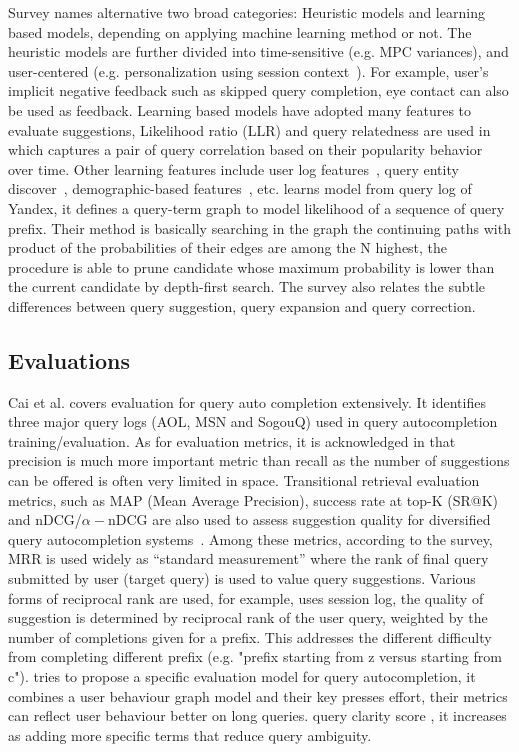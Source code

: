 \documentclass[12pt]{article} %
\begin{document}
Survey \cite{cai_survey_2016} names alternative two broad categories: Heuristic models and learning based models, depending on applying machine learning method or not.
The heuristic models are further divided into time-sensitive (e.g. MPC variances), and user-centered (e.g. personalization using session context~\cite{schmidt_context_sensitive_2016}).
For example, user's implicit negative feedback such as skipped query completion, eye contact can also be used as feedback.
Learning based models have adopted many features to evaluate suggestions, Likelihood ratio (LLR) and query relatedness are used in \cite{chien_semantic_2005} which captures a pair of query correlation based on their popularity behavior over time. Other learning features include user log features~\cite{kharitonov_user_2013}, query entity discover~\cite{guo_named_2009}, demographic-based features~\cite{shokouhi_learning_2013}, etc.
\cite{kharitonov_user_2013} learns model from query log of Yandex,
it defines a query-term graph to model likelihood of a sequence of query prefix. Their
method is basically searching in the graph the continuing paths with product of
the probabilities of their edges are among the N highest, the procedure is able to
prune candidate whose maximum probability is lower than the current candidate
by depth-first search.
The survey also relates the subtle differences between query suggestion, query expansion and query correction.

\subsection{Evaluations}
Cai et al. \cite{cai_survey_2016} covers evaluation for query auto completion extensively.
It identifies three major query logs (AOL, MSN and SogouQ) used in query autocompletion training/evaluation.
As for evaluation metrics, 
it is acknowledged in \cite{bhatia_query_2011} that precision is much more important metric than recall as the number of suggestions can be offered is often very limited in space.
Transitional retrieval evaluation metrics, such as MAP (Mean Average Precision), success rate at top-K (SR@K) and nDCG/$\alpha-$nDCG are also used to assess suggestion quality for diversified query autocompletion systems~\cite{cai_survey_2016}.
Among these metrics, according to the survey, MRR is used widely as ``standard measurement'' where the rank of final query submitted by user (target query) is used to value query suggestions.
Various forms of reciprocal rank are used, for example, \cite{bar-yossef_context-sensitive_2011} uses session log, the quality of suggestion is determined by reciprocal rank
of the user query, weighted by the number of completions given for a prefix. This addresses the different difficulty from completing different prefix (e.g. "prefix starting from z versus starting from c").
\cite{kharitonov_user_2013} tries to propose a specific evaluation model for query autocompletion, it combines a user behaviour graph model and their key presses effort, their metrics can reflect user behaviour better on long queries.
query clarity score  \cite{bhatia_query_2011, predicting_2002}, it increases as adding more specific terms that reduce query ambiguity.
\end{document}
